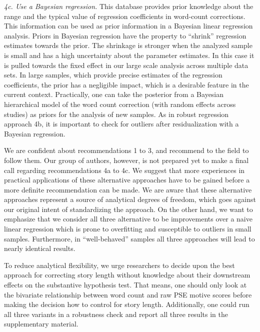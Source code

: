 \documentclass[man,a4paper,mask]{apa6}\usepackage[]{graphicx}\usepackage[]{color}
\begin{document}
\emph{4c. Use a Bayesian regression.} This database provides prior knowledge about the range and the typical value of regression coefficients in word-count corrections. This information can be used as prior information in a Bayesian linear regression analysis. Priors in Bayesian regression have the property to ``shrink'' regression estimates towards the prior. The shrinkage is stronger when the analyzed sample is small and has a high uncertainty about the parameter estimates. In this case it is pulled towards the fixed effect in our large scale analysis across multiple data sets. In large samples, which provide precise estimates of the regression coefficients, the prior has a negligible impact, which is a desirable feature in the current context. 
Practically, one can take the posterior from a Bayesian hierarchical model of the word count correction (with random effects across studies) as priors for the analysis of new samples. 
As in robust regression approach 4b, it is important to check for outliers after residualization with a Bayesian regression.


We are confident about recommendations 1 to 3, and recommend to the field to follow them. Our group of authors, however, is not prepared yet to make a final call regarding recommendations 4a to 4c. We suggest that more experiences in practical applications of these alternative approaches have to be gained before a more definite recommendation can be made. We are aware that these alternative approaches represent a source of analytical degrees of freedom, which goes against our original intent of standardizing the approach. On the other hand, we want to emphasize that we consider all three alternative to be improvements over a naive linear regression which is prone to overfitting and susceptible to outliers in small samples. Furthermore, in ``well-behaved'' samples all three approaches will lead to nearly identical results.

To reduce analytical flexibility, we urge researchers to decide upon the best approach for correcting story length without knowledge about their downstream effects on the substantive hypothesis test. That means, one should only look at the bivariate relationship between word count and raw PSE motive scores before making the decision how to control for story length. Additionally, one could run all three variants in a robustness check and report all three results in the supplementary material.
\end{document}
